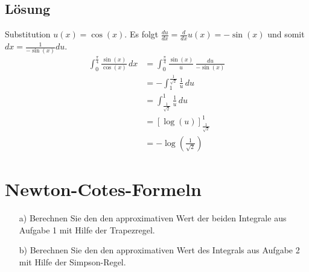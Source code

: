 \subsection*{Lösung}
Substitution $u(x) = \cos(x)$. Es folgt $\frac{du}{dx} = \frac{d}{dx}u(x) = -\sin(x)$ und somit $dx=\frac{1}{-\sin(x)}du$.
	\begin{align*}
		\int_0^{\frac{\pi}{4}} \frac{\sin(x)}{\cos(x)}\, dx&= \int_0^{\frac{\pi}{4}} \frac{\sin(x)}{u}\, \frac{du}{-\sin(x)}	\\
				&= -\int_1^{\frac{1}{\sqrt{2}}} \frac{1}{u}\, du	\\
				&= \int_{\frac{1}{\sqrt{2}}}^1 \frac{1}{u}\, du	\\
				&= [\log(u)]_{\frac{1}{\sqrt{2}}}^1	\\
				&= -\log(\frac{1}{\sqrt{2}})
		\end{align*}

\newpage
\section{Newton-Cotes-Formeln}
\begin{itemize}
\item[a)] Berechnen Sie den den approximativen Wert der beiden Integrale aus Aufgabe 1 mit Hilfe der Trapezregel.
\item[b)] Berechnen Sie den den approximativen Wert des Integrals aus Aufgabe 2 mit Hilfe der Simpson-Regel.

\end{itemize}

